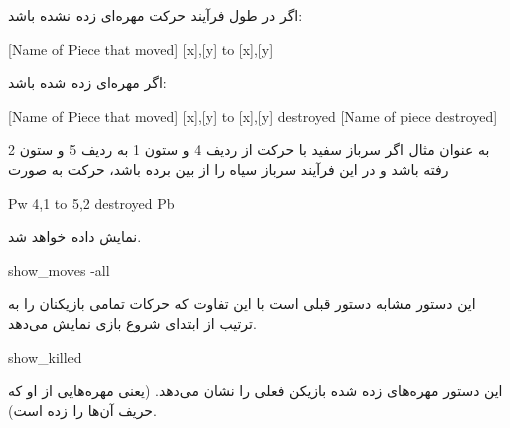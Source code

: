 \documentclass[]{article}
\begin{document}
اگر در طول فرآیند حرکت مهره‌ای زده نشده باشد:



\begin{tcolorbox}[boxrule=0pt]
	\begin{latin}
  	  \large{
  	  	[Name of Piece that moved] [x],[y] to [x],[y]
		}
	\end{latin}
\end{tcolorbox}

اگر مهره‌ای زده شده باشد:




\begin{tcolorbox}[boxrule=0pt]
	\begin{latin}
  	  \large{
  	  	[Name of Piece that moved] [x],[y] to [x],[y] destroyed [Name of piece destroyed]
		}
	\end{latin}
\end{tcolorbox}


به عنوان مثال اگر سرباز سفید با حرکت از ردیف 4 و ستون 1 به ردیف 5 و ستون 2 رفته باشد و در این فرآیند سرباز سیاه را از بین برده باشد، حرکت به صورت



\begin{tcolorbox}[boxrule=0pt]
	\begin{latin}
  	  \large{
  	  	Pw 4,1 to 5,2 destroyed Pb
		}
	\end{latin}
\end{tcolorbox}

نمایش داده خواهد شد.

\hrulefill


\begin{tcolorbox}[boxrule=0pt]
	\begin{latin}
  	  \large{
  	  	show\_moves -all
		}
	\end{latin}
\end{tcolorbox}

این دستور مشابه دستور قبلی است با این تفاوت که حرکات تمامی بازیکنان را به ترتیب از ابتدای شروع بازی نمایش می‌دهد.

\hrulefill



\begin{tcolorbox}[boxrule=0pt]
	\begin{latin}
  	  \large{
  	  	show\_killed
		}
	\end{latin}
\end{tcolorbox}


این دستور مهره‌های زده شده بازیکن فعلی را نشان می‌دهد. (یعنی مهره‌هایی از او که حریف آن‌ها را زده است).
\end{document}
